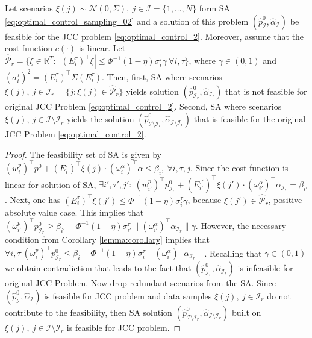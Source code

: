 \begin{theorem}
Let scenarios $\xi(j) \sim \mathcal{N}(0, \Sigma), ~ j \in \mathcal{I}=\{1, \dots, N\}$ form SA \eqref{eq:optimal_control_sampling_02} and a solution of this problem $(\hat{p}^0_{\mathcal{I}}, \hat{\alpha}_{\mathcal{I}})$ be feasible for the JCC problem \eqref{eq:optimal_control_2}. Moreover, assume that the cost function $c(\cdot)$ is linear.  Let $\hat{\mathcal{P}}_r = \{ \xi\in \mathbb{R}^T:~ |(E^{\tau}_i)^\top \xi|  \leq \Phi^{-1}(1 - \eta) \sigma^\tau_i \gamma ~\forall i, \tau \}$, where $\gamma \in (0, 1)$ and $(\sigma^\tau_i)^2 = (E^\tau_i)^\top \Sigma (E^\tau_i)$.
Then, first, SA  where scenarios $\xi(j), ~ j \in \mathcal{I}_r = \{ j: \xi(j) \in \hat{\mathcal{P}}_r \}$ yields solution $(\hat{p}^0_{\mathcal{I}_r}, \hat{\alpha}_{\mathcal{I}_r})$ that is not feasible for original JCC Problem \eqref{eq:optimal_control_2}. Second, SA where scenarios $\xi(j), ~ j \in \mathcal{I} \setminus \mathcal{I}_r$ yields the solution $(\hat{p}^0_{\mathcal{I} \setminus \mathcal{I}_r}, \hat{\alpha}_{\mathcal{I} \setminus \mathcal{I}_r})$ that is feasible for the original JCC Problem \eqref{eq:optimal_control_2}.
\label{th:P_r sampling polytope}
\end{theorem}
\begin{proof}
    The feasibility set of SA is given by $(w^p_i)^\top p^0 + (E_i^\tau)^\top \xi(j) \cdot (\omega^\alpha_i)^\top \alpha \leq \beta_i, ~ \forall i, \tau, j$. Since the cost function is linear for solution of SA, $\exists i', \tau', j': ~ (w^p_{i'})^\top p_{\mathcal{I}_r}^0 + (E_{i'}^{\tau'})^\top \xi(j') \cdot (\omega^\alpha_{i'})^\top \alpha_{\mathcal{I}_r} = \beta_{i'}$. Next, one has $(E^{\tau}_i)^\top \xi (j')  \leq \Phi^{-1}(1 - \eta) \sigma^\tau_i \gamma$, because $
    \xi(j') \in \hat{\mathcal{P}}_r$, positive absolute value case. This implies that $(\omega^p_{i'})^\top p^0_{\mathcal{I}_r} \geq \beta_{i'} - \Phi^{-1}(1-\eta) \sigma^{\tau'}_{i'} \| (\omega_{i'}^\alpha)^\top \alpha_{\mathcal{I}_r} \| \gamma$. However, the necessary condition from Corollary \ref{lemma:corollary} implies that $\forall i, \tau ~ (\omega_i^p)^\top p^0_{\mathcal{I}_r} \leq \beta_i - \Phi^{-1}(1-\eta) \sigma^\tau_i \| (\omega_i^\alpha)^\top\alpha_{\mathcal{I}_r}\|$. Recalling that $\gamma \in (0, 1)$ we obtain contradiction that leads to the fact that $(\hat{p}_{\mathcal{I}_r}^0, \hat{\alpha}_{\mathcal{I}_r})$ is infeasible for original JCC Problem.
    Now drop redundant scenarios from the SA. Since $(\hat{p}^0_{\mathcal{I}}, \hat{\alpha}_{\mathcal{I}})$ is feasible for JCC problem and data samples $\xi(j), ~ j \in \mathcal{I}_r$ do not contribute to the feasibility, then SA solution $(\hat{p}_{\mathcal{I} \setminus \mathcal{I}_r}^0, \hat{\alpha}_{\mathcal{I} \setminus \mathcal{I}_r})$ built on $\xi(j), ~ j \in \mathcal{I} \setminus \mathcal{I}_r$ is feasible for JCC problem.
\end{proof}

